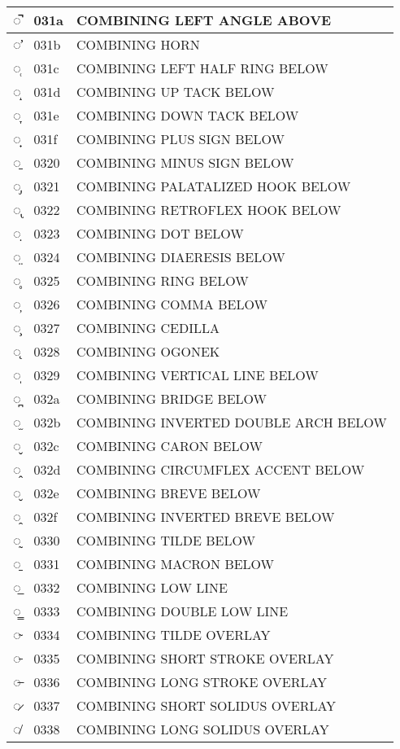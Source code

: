 \documentclass[12pt,letterpaper,openany]{book}
\begin{document}
\begin{center}
\begin{supertabular}{|m{0.25in}|m{0.5in}|m{4in}|}
◌̚ & 031a & COMBINING LEFT ANGLE ABOVE\\\hline
◌̛ & 031b & COMBINING HORN\\\hline
◌̜ & 031c & COMBINING LEFT HALF RING BELOW\\\hline
◌̝ & 031d & COMBINING UP TACK BELOW\\\hline
◌̞ & 031e & COMBINING DOWN TACK BELOW\\\hline
◌̟ & 031f & COMBINING PLUS SIGN BELOW\\\hline
◌̠ & 0320 & COMBINING MINUS SIGN BELOW\\\hline
◌̡ & 0321 & COMBINING PALATALIZED HOOK BELOW\\\hline
◌̢ & 0322 & COMBINING RETROFLEX HOOK BELOW\\\hline
◌̣ & 0323 & COMBINING DOT BELOW\\\hline
◌̤ & 0324 & COMBINING DIAERESIS BELOW\\\hline
◌̥ & 0325 & COMBINING RING BELOW\\\hline
◌̦ & 0326 & COMBINING COMMA BELOW\\\hline
◌̧ & 0327 & COMBINING CEDILLA\\\hline
◌̨ & 0328 & COMBINING OGONEK\\\hline
◌̩ & 0329 & COMBINING VERTICAL LINE BELOW\\\hline
◌̪ & 032a & COMBINING BRIDGE BELOW\\\hline
◌̫ & 032b & COMBINING INVERTED DOUBLE ARCH BELOW\\\hline
◌̬ & 032c & COMBINING CARON BELOW\\\hline
◌̭ & 032d & COMBINING CIRCUMFLEX ACCENT BELOW\\\hline
◌̮ & 032e & COMBINING BREVE BELOW\\\hline
◌̯ & 032f & COMBINING INVERTED BREVE BELOW\\\hline
◌̰ & 0330 & COMBINING TILDE BELOW\\\hline
◌̱ & 0331 & COMBINING MACRON BELOW\\\hline
◌̲ & 0332 & COMBINING LOW LINE\\\hline
◌̳ & 0333 & COMBINING DOUBLE LOW LINE\\\hline
◌̴ & 0334 & COMBINING TILDE OVERLAY\\\hline
◌̵ & 0335 & COMBINING SHORT STROKE OVERLAY\\\hline
◌̶ & 0336 & COMBINING LONG STROKE OVERLAY\\\hline
◌̷ & 0337 & COMBINING SHORT SOLIDUS OVERLAY\\\hline
◌̸ & 0338 & COMBINING LONG SOLIDUS OVERLAY\\\hline

\end{supertabular}
\end{center}
\end{document}
